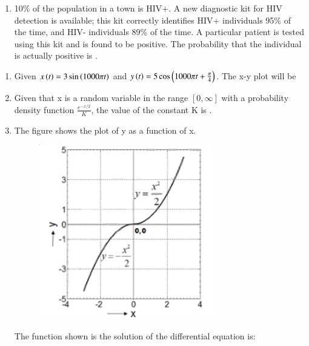 \documentclass[journal,12pt,onecolumn]{IEEEtran}
\theoremstyle{remark}
\begin{document}
\begin{enumerate}
    \item 10\% of the population in a town is HIV+. A new diagnostic kit for HIV detection is available; this kit correctly identifies HIV+ individuals 95\% of the time, and HIV- individuals 89\% of the time. A particular patient is tested using this kit and is found to be positive. The probability that the individual is actually positive is \underline{\hspace{2cm}}.

    \hfill{}

\end{enumerate}

\clearpage

\begin{enumerate}
    \item Given $x\left(t\right) = 3 \sin\left(1000 \pi t\right)$ and $y\left(t\right) = 5 \cos\left(1000 \pi t + \frac{\pi}{4}\right)$. The x-y plot will be

    \hfill{}
        \begin{enumerate}
        \end{enumerate}
    
    \item Given that x is a random variable in the range $[0, \infty]$ with a probability density function $\frac{e^{-x/2}}{K}$, the value of the constant K is \underline{\hspace{2cm}}.

    \hfill{}

    
    
    \item The figure shows the plot of y as a function of x.
    \begin{figure}[H]
        \centering
        \includegraphics[width=0.5\columnwidth]{q3}
        \caption*{}
        \label{Q3}
    \end{figure}
    The function shown is the solution of the differential equation  is:


\end{enumerate}
\end{document}
